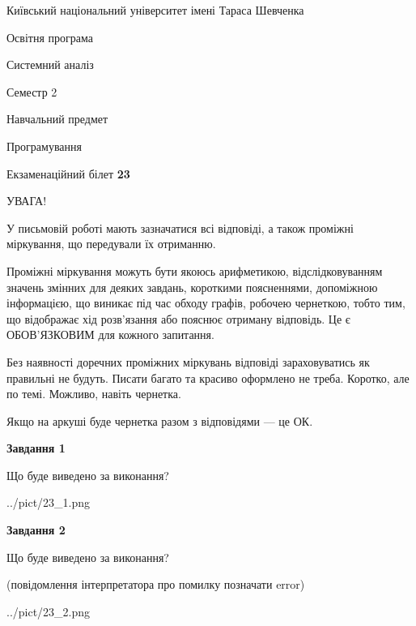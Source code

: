 \documentclass[12pt, ukrainian]{article}
\begin{document}
{{\begin {small}\par
{ \center  Київський національний університет імені Тараса Шевченка \par}
{\parbox {5 cm}{Освітня програма \hfill}{\parbox {7 cm}{Системний аналіз \hfill}}\parbox {6 cm}{\hfill Семестр 2}}\par
{\parbox {5 cm} {Навчальний предмет \hfill}\parbox {7 cm}{Програмування \hfill}\parbox {6cm}{\hfill}\par}\vspace{-7pt} \end{small}}{\center Екзаменаційний білет \No \textbf
{ 23 }\par}}
{
\begin {large}
УВАГА!

У письмовій роботі мають зазначатися всі відповіді, а також проміжні міркування, що передували їх отриманню.

Проміжні міркування можуть бути якоюсь арифметикою, відслідковуванням зна\-чень змінних для деяких завдань,
короткими поясненнями, допоміжною інформацією, що виникає під час обходу графів, робочею чернеткою,
тобто тим, що відображає хід розв’язання або пояснює отриману відповідь.
Це є ОБОВ’ЯЗКОВИМ для кожного запитання.

Без наявності доречних проміжних міркувань відповіді зараховуватись як правиль\-ні не будуть.
Писати багато та красиво оформлено не треба. Коротко, але по темі. Можли\-во, навіть чернетка.

Якщо на аркуші буде чернетка разом з відповідями --- це ОК.

\newpage

{\begin {center}\textbf{Завдання 1}\end {center}}\par
Що буде виведено за виконання?\par
\begin{center}
	{../pict/23_1.png}
\end{center}
\newpage

{\begin {center}\textbf{Завдання 2}\end {center}}\par
Що буде виведено за виконання?\par
 (повідомлення інтерпретатора про помилку позначати error)\par
\begin{center}
	{../pict/23_2.png}
\end{center}
\newpage


\end{large}}
\end{document}

